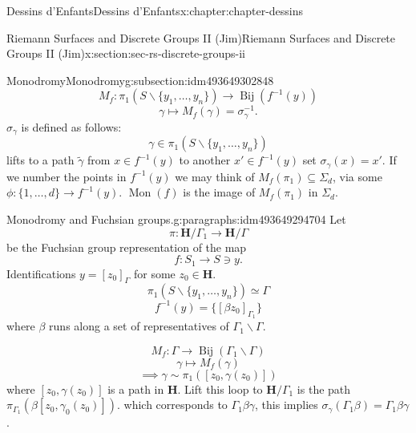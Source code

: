 \documentclass[oneside,10pt,]{book}
\numberwithin{equation}{section}
\newcommand{\inv}{^{-1}}
\newcommand{\lb}{[}
\newcommand{\rb}{]}
\newcommand{\HH}{\mathbf{H}}
\begin{document}
\begin{chapterptx}{Dessins d'Enfants}{}{Dessins d'Enfants}{}{}{x:chapter:chapter-dessins}
\begin{sectionptx}{Riemann Surfaces and Discrete Groups II (Jim)}{}{Riemann Surfaces and Discrete Groups II (Jim)}{}{}{x:section:sec-rs-discrete-groups-ii}
\begin{subsectionptx}{Monodromy}{}{Monodromy}{}{}{g:subsection:idm493649302848}
\begin{equation*}
M_f\colon \pi_1(S \smallsetminus \{y_1, \ldots, y_n\} )\to \operatorname{Bij} (f\inv (y))
\end{equation*}
%
\begin{equation*}
\gamma \mapsto M_f(\gamma) = \sigma_\gamma\inv\text{.}
\end{equation*}
\(\sigma_\gamma\) is defined as follows:%
\begin{equation*}
\gamma \in \pi_1(S\smallsetminus \{ y_1,\ldots, y_n\})
\end{equation*}
lifts to a path \(\widetilde \gamma\) from \(x\in f\inv(y)\) to another \(x' \in f\inv(y)\) set \(\sigma_\gamma(x) =x'\). If we number the points in \(f\inv (y)\) we may think of \(M_f(\pi_1)\subseteq \Sigma_d\), via some \(\phi\colon \{1,\ldots, d\}\to f\inv (y)\). \(\operatorname{Mon}(f)\) is the image of \(M_f(\pi_1)\) in \(\Sigma_d\).%
\begin{paragraphs}{Monodromy and Fuchsian groups.}{g:paragraphs:idm493649294704}%
Let%
\begin{equation*}
\pi \colon \HH/\Gamma_1 \to \HH/ \Gamma
\end{equation*}
be the Fuchsian group representation of the map%
\begin{equation*}
f\colon S_1 \to S\ni y\text{.}
\end{equation*}
Identifications \(y = \lb z_0 \rb_\Gamma\) for some \(z_0 \in \HH\).%
\begin{equation*}
\pi_1 (S\smallsetminus \{y_1,\ldots, y_n\}) \simeq \Gamma
\end{equation*}
%
\begin{equation*}
f\inv(y ) = \{ [\beta z_0]_{\Gamma_1}\}
\end{equation*}
where \(\beta\) runs along a set of representatives of \(\Gamma_1\backslash \Gamma\).%
\par
%
\begin{equation*}
M_f \colon \Gamma \to \operatorname{Bij} (\Gamma_1\backslash \Gamma)
\end{equation*}
%
\begin{equation*}
\gamma \mapsto M_f(\gamma)
\end{equation*}
%
\begin{equation*}
\implies \gamma \sim \pi_1([z_0,\gamma(z_0)])
\end{equation*}
where \(\lb z_0, \gamma(z_0) \rb\) is a path in \(\HH\). Lift this loop to \(\HH/\Gamma_1\) is the path \(\pi_{\Gamma_1}(\beta \lb z_0, \gamma_0(z_0)\rb)\). which corresponds to \(\Gamma_1 \beta \gamma\), this implies \(\sigma_\gamma(\Gamma_1\beta)  = \Gamma_1 \beta\gamma\).%

\end{paragraphs}
\end{subsectionptx}
\end{sectionptx}
\end{chapterptx}
\end{document}

